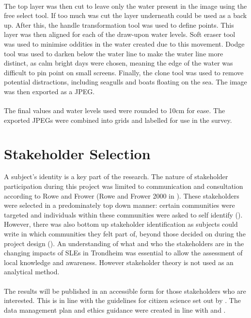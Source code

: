 \paragraph{}
The top layer was then cut to leave only the water present in the image using the free select tool. If too much was cut the layer underneath could be used as a back up. After this, the handle transformation tool was used to define points. This layer was then aligned for each of the draw-upon water levels. Soft eraser tool was used to minimise oddities in the water created due to this movement. Dodge tool was used to darken below the water line to make the water line more distinct, as calm bright days were chosen, meaning the edge of the water was difficult to pin point on small screens. Finally, the clone tool was used to remove potential distractions, including seagulls and boats floating on the sea. The image was then exported as a JPEG. 

\paragraph{}
The final values and water levels used were rounded to 10cm for ease. The exported JPEGs were combined into grids and labelled for use in the survey. 

\section{Stakeholder Selection}
A subject's identity is a key part of the research. The nature of stakeholder participation during this project was limited to communication and consultation according to Rowe and Frower  (Rowe and Frower 2000 in \cite{reed_stakeholder_2008}). These stakeholders were selected in a predominately top down manner:  certain communities were targeted and individuals within these communities were asked to self identify (\cite{reed_stakeholder_2008}). However, there was also bottom up stakeholder identification as subjects could write in which communities they felt part of, beyond those decided on during the project design (\cite{reed_stakeholder_2008}). An understanding of what and who the stakeholders are in the changing impacts of SLEs in Trondheim was essential to allow the assessment of local knowledge and awareness. However stakeholder theory is not used as an analytical method.
\paragraph{}
The results will be published in an accessible form for those stakeholders who are interested. This is in line with the guidelines for citizen science set out by \cite{tweddle_guide_2012}. The data management plan and ethics guidance were created in line with \cite{nesh_guidelines_2022} and \cite{nsd_norsk_nodate}. 

